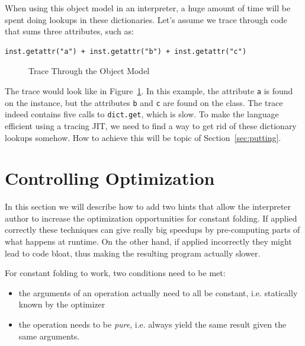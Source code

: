 \documentclass{sig-alternate}
\begin{document}
When using this object model in
an interpreter, a huge amount of time will be spent doing lookups in these
dictionaries.
Let's assume we trace through code that sums three attributes, such as:

\begin{Verbatim}
inst.getattr("a") + inst.getattr("b") + inst.getattr("c")
\end{Verbatim}

\begin{figure}

\caption{Trace Through the Object Model}
\label{fig:trace1}
\end{figure}

The trace would look like in Figure~\ref{fig:trace1}. In this example, the
attribute \texttt{a} is found on the instance, but the
attributes \texttt{b} and \texttt{c} are found on the class. The trace indeed contains
five calls to \texttt{dict.get}, which is slow. To make the language efficient
using a tracing JIT, we need to find a way to get rid of these dictionary
lookups somehow. How to achieve this will be topic of
Section~\ref{sec:putting}.






\section{Controlling Optimization}

In this section we will describe how to add two hints that allow the
interpreter author to increase the optimization opportunities for constant
folding. If applied correctly these techniques can give really big speedups by
pre-computing parts of what happens at runtime. On the other
hand, if applied incorrectly they might lead to code bloat, thus making the
resulting program actually slower.

For constant folding to work, two conditions need to be met:

\begin{itemize}
    \item the arguments of an operation actually need to all be constant,
    i.e. statically known by the optimizer
    \item the operation needs to be \emph{pure}, i.e. always yield the same result given
    the same arguments.
\end{itemize}
\end{document}

